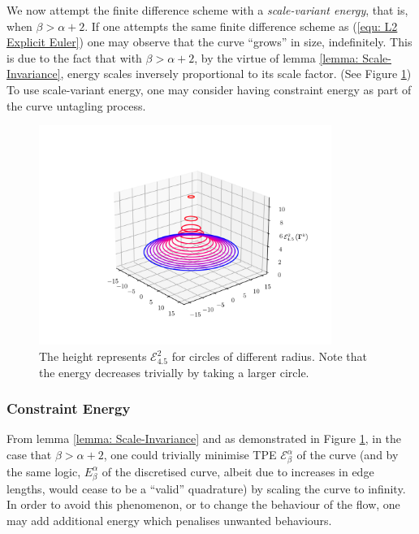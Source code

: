 \documentclass[../dissertation.tex]{subfiles}
\begin{document}
We now attempt the finite difference scheme with a \textit{scale-variant energy}, that is, when $\beta > \alpha + 2$. 
If one attempts the same finite difference scheme as (\ref{equ: L2 Explicit Euler})
one may observe that the curve ``grows'' in size, indefinitely.
This is due to the fact that with $\beta > \alpha + 2$,
by the virtue of lemma \ref{lemma: Scale-Invariance},
energy scales inversely proportional to its scale factor.
(See Figure \ref{fig: Scale Variant})
To use scale-variant energy, one may consider having constraint energy as part of the curve untagling process.
\begin{figure}[tbp]
    \centering
    \includegraphics[width=0.85\textwidth]{sections/unknottingCurveImgs/scaleVariant}
    \caption{The height represents $\mathcal{E}_{4.5}^{2}$ for circles of different radius. Note that the energy decreases trivially by taking a larger circle.}
    \label{fig: Scale Variant}
\end{figure}
\subsubsection{Constraint Energy}
\label{sct: Constraint Energy}
From lemma \ref{lemma: Scale-Invariance} and as demonstrated in Figure \ref{fig: Scale Variant}, in the case that $\beta > \alpha + 2$,
one could trivially minimise TPE $\mathcal{E}_{\beta}^{\alpha}$ of the curve 
(and by the same logic, $E_{\beta}^{\alpha}$ of the discretised curve, albeit due to increases in edge lengths, would cease to be a ``valid'' quadrature)
by scaling the curve to infinity.
In order to avoid this phenomenon, or to change the behaviour of the flow, one may add additional energy which penalises unwanted behaviours.
\end{document}
